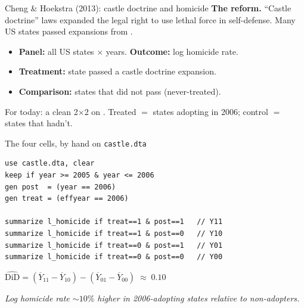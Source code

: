 \documentclass[aspectratio=169,11pt]{beamer}
\begin{document}
\begin{frame}[shrink=6]{Cheng \& Hoekstra (2013): castle doctrine and homicide}
\vspace{0.2em}
\footnotesize
\textbf{The reform.} ``Castle doctrine'' laws expanded the legal right to use lethal force in self-defense. Many US states passed expansions from .
\vspace{0.2em}
\begin{itemize}
  \item \textbf{Panel:} all US states $\times$ years. \textbf{Outcome:} log homicide rate.
  \item \textbf{Treatment:} state passed a castle doctrine expansion.
  \item \textbf{Comparison:} states that did not pass (never-treated).
\end{itemize}
\vspace{0.4em}
For today: a clean 2$\times$2 on . Treated $=$ states adopting in 2006; control $=$ states that hadn't.
\vspace{0.4em}
\end{frame}

\begin{frame}[fragile]{The four cells, by hand on \texttt{castle.dta}}
\vspace{0.2em}
\begin{lstlisting}[language={[ANSI]C}]
use castle.dta, clear
keep if year >= 2005 & year <= 2006
gen post  = (year == 2006)
gen treat = (effyear == 2006)

summarize l_homicide if treat==1 & post==1   // Y11
summarize l_homicide if treat==1 & post==0   // Y10
summarize l_homicide if treat==0 & post==1   // Y01
summarize l_homicide if treat==0 & post==0   // Y00
\end{lstlisting}
\vspace{0.4em}
\begin{center}
\small
$\widehat{\text{DiD}} = (\overline{Y}_{11} - \overline{Y}_{10}) - (\overline{Y}_{01} - \overline{Y}_{00}) \;\approx\; \mathbf{0.10}$
\end{center}
\begin{center}
\small\color{warmgray}\itshape Log homicide rate $\sim 10\%$ higher in 2006-adopting states relative to non-adopters.
\end{center}
\end{frame}
\end{document}
